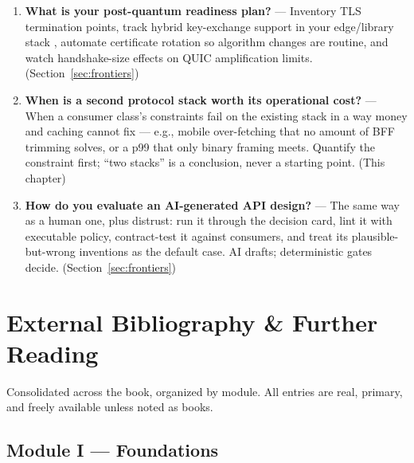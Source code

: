 \begin{enumerate}[label=\textbf{Q\arabic*.}, leftmargin=3em, start=25]
        (Ch.~\ref{ch:lifecycle})
  \item \textbf{What is your post-quantum readiness plan?} --- Inventory TLS
        termination points, track hybrid key-exchange support in your
        edge/library stack \cite{rfc8446}, automate certificate rotation so
        algorithm changes are routine, and watch handshake-size effects on
        QUIC amplification limits. (Section~\ref{sec:frontiers})
  \item \textbf{When is a second protocol stack worth its operational
        cost?} --- When a consumer class's constraints fail on the existing
        stack in a way money and caching cannot fix --- e.g., mobile
        over-fetching that no amount of BFF trimming solves, or a p99 that
        only binary framing meets. Quantify the constraint first; ``two
        stacks'' is a conclusion, never a starting point. (This chapter)
  \item \textbf{How do you evaluate an AI-generated API design?} --- The
        same way as a human one, plus distrust: run it through the decision
        card, lint it with executable policy, contract-test it against
        consumers, and treat its plausible-but-wrong inventions as the
        default case. AI drafts; deterministic gates decide.
        (Section~\ref{sec:frontiers})
\end{enumerate}

\section{External Bibliography \& Further Reading}

Consolidated across the book, organized by module. All entries are real,
primary, and freely available unless noted as books.

\subsection*{Module I --- Foundations}

